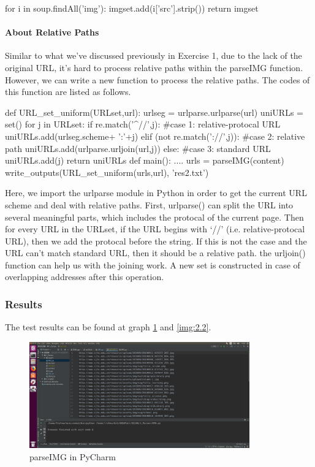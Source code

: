 \documentclass{article}
\begin{document}
\begin{python}
    for i in soup.findAll('img'):
        imgset.add(i['src'].strip())
    return imgset
\end{python}

\paragraph{About Relative Paths} Similar to what we've discussed previously in Exercise 1, due to the lack of the original URL, it's hard to process relative paths within the parseIMG function. However, we can write a new function to process the relative paths. The codes of this function are listed as follows.

\begin{python}
def URL_set_uniform(URLset,url):
    urlseg = urlparse.urlparse(url)
    uniURLs = set()
    for j in URLset:
        if re.match('^//',j):         #case 1: relative-protocal URL
            uniURLs.add(urlseg.scheme+ ':'+j)
        elif (not re.match('://',j)): #case 2: relative path
            uniURLs.add(urlparse.urljoin(url,j))
        else:                         #case 3: standard URL
            uniURLs.add(j)
    return uniURLs
def main():
    ....
    urls = parseIMG(content)
    write_outputs(URL_set_uniform(urls,url), 'res2.txt')
\end{python}

Here, we import the urlparse module in Python in order to get the current URL scheme and deal with relative paths. First, urlparse() can split the URL into several meaningful parts, which includes the protocal of the current page. Then for every URL in the URLset, if the URL begins with `//' (i.e. relative-protocal URL), then we add the protocal before the string. If this is not the case and the URL can't match standard URL, then it should be a relative path. the urljoin() function can help us with the joining work. A new set is constructed in case of overlapping addresses after this operation. 

\subsubsection{Results}

The test results can be found at graph \ref{img:2.1} and \ref{img:2.2}.

\begin{figure}[htbp]
\centering
\includegraphics[width=9.5cm]{img/test2_1.png}
\caption{parseIMG in PyCharm}
\label{img:2.1}
\end{figure}
\end{document}
